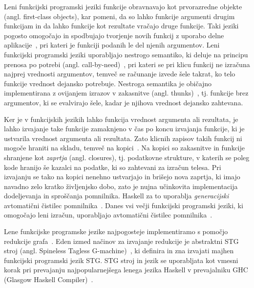 Leni funkcijski programski jeziki funkcije obravnavajo kot prvorazredne ob\-jek\-te (angl. first-class objects), kar pomeni, da so lahko funkcije argumenti drugim funkcijam in da lahko funkcije kot rezultate vračajo druge funkcije. Taki jeziki pogosto omogočajo in spodbujajo tvorjenje novih funkcij z uporabo delne aplikacije~\cite{10.1145/72551.72554}, pri kateri je funkciji podanih le del njenih argumentov. Leni funkcijski programski jeziki uporabljajo nestrogo semantiko, ki deluje na principu prenosa po potrebi (angl. call-by-need)~\cite{scott2016programming}, pri kateri se pri klicu funkcij ne izračuna najprej vrednosti argumentov, temveč se računanje izvede šele takrat, ko telo funkcije vrednost dejansko potrebuje. Nestroga semantika je običajno implementirana z ovijanjem izrazov v zakasnitve (angl. thunks)~\cite{peyton1987implementation}, tj. funkcije brez argumentov, ki se evalvirajo šele, kadar je njihova vrednost dejansko zahtevana.

Ker je v funkcijskih jezikih lahko funkcija vrednost argumenta ali rezultata, je lahko izvajanje take funkcije zamaknjeno v čas po koncu izvajanja funkcije, ki je ustvarila vrednost argumenta ali rezultata. Zato klicnih zapisov takih funkcij ni mogoče hraniti na skladu, temveč na kopici~\cite{jones2023garbage}. Na kopici so zakasnitve in funkcije shranjene kot \textit{zaprtja} (angl. closures), tj. podatkovne strukture, v katerih se poleg kode hranijo še kazalci na podatke, ki so zahtevani za izračun telesa. Pri izvajanju se tako na kopici nenehno ustvarjajo in brišejo nova zaprtja, ki imajo navadno zelo kratko življenjsko dobo, zato je nujna učinkovita implementacija dodeljevanja in sproščanja pomnilnika. Haskell za to uporablja \textit{generacijski} avtomatični čistilec pomnilnika~\cite{sansom1993generational, GHC}. Danes vsi večji funkcijski programski jeziki, ki omogočajo leni izračun, uporabljajo avtomatični čistilec pomnilnika~\cite{turner1985miranda, czaplicki2012elm, brus1987clean, syme2017the, sperber2009revised6}.

Lene funkcijske programske jezike najpogosteje implementiramo s pomočjo redukcije gra\-fa~\cite{peyton1987implementation}. Eden izmed načinov za izvajanje redukcije je abstraktni STG stroj (angl. Spineless Tagless G-machine)~\cite{jones1992implementing}, ki definira in zna izvajati majhen funkcijski programski jezik STG. STG stroj in jezik se uporabljata kot vmesni korak pri prevajanju najpopularnejšega lenega jezika Haskell v prevajalniku GHC (Glasgow Haskell Compiler)~\cite{GHC}.

